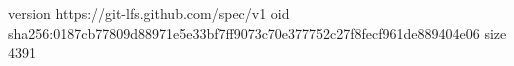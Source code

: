 version https://git-lfs.github.com/spec/v1
oid sha256:0187cb77809d88971e5e33bf7ff9073c70e377752c27f8fecf961de889404e06
size 4391
